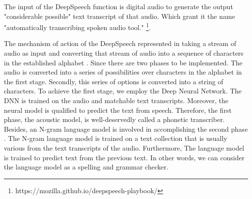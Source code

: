 
 The input of the DeepSpeech function is digital audio to generate the output "considerable possible" text transcript of that audio. Which grant it the name "automatically transcribing spoken audio tool." \footnote{https://mozilla.github.io/deepspeech-playbook/}.

The mechanism of action of the DeepSpeech represented in 
taking a stream of audio as input and converting that stream of audio into a sequence of characters in the established alphabet \cite{asyrofi2020crossasr}. Since there are two phases to be implemented. The audio is converted into a series of possibilities over characters in the alphabet in the first stage. Secondly, this series of options is converted into a string of characters.
To achieve the first stage, we employ the Deep Neural Network. The DNN is trained on the audio and matchable text transcripts. Moreover, the neural model is qualified to predict the text from speech. Therefore, the first phase, the acoustic model, is well-deservedly called a phonetic transcriber. Besides, an N-gram language model is involved in accomplishing the second phase \cite{markert2022language,michel2019evaluation}. The N-gram language model is trained on a text collection that is usually various from the text transcripts of the audio. Furthermore, The language model is trained to predict text from the previous text. In other words, we can consider the language model as a spelling and grammar checker.




 





